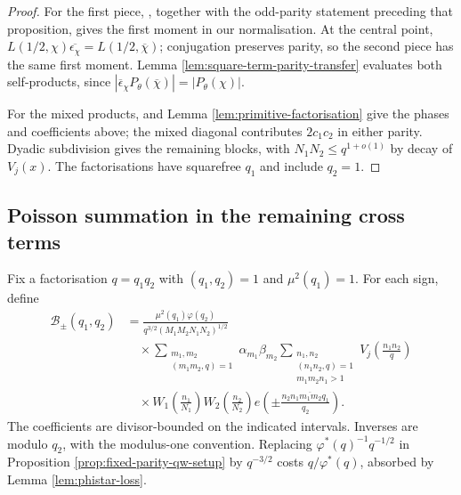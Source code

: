 \documentclass[12pt, a4paper]{amsart}
\numberwithin{equation}{section}
\newcommand{\e}{e}
\renewcommand{\bar}[1]{\overline{#1}}
\renewcommand{\le}{\leqslant}
\theoremstyle{plain}
\begin{document}
\begin{proof}
For the first piece, \cite[Proposition 2.1 and (2.4)]{QW}, together with the odd-parity statement preceding that proposition, gives the first moment in our normalisation. At the central point, $L(1/2,\chi)\overline{\epsilon_\chi}=L(1/2,\overline\chi)$; conjugation preserves parity, so the second piece has the same first moment. Lemma \ref{lem:square-term-parity-transfer} evaluates both self-products, since $|\bar\epsilon_\chi P_\theta(\bar\chi)|=|P_\theta(\chi)|$.

For the mixed products, \cite[(3.2)--(3.4)]{QW} and Lemma \ref{lem:primitive-factorisation} give the phases and coefficients above; the mixed diagonal contributes $2c_1c_2$ in either parity. Dyadic subdivision gives the remaining blocks, with $N_1N_2\le q^{1+o(1)}$ by decay of $V_j(x)$. The factorisations have squarefree $q_1$ and include $q_2=1$.
\end{proof}

\subsection{Poisson summation in the remaining cross terms}

Fix a factorisation ${q=q_1q_2}$ with $(q_1,q_2)=1$ and $\mu^2(q_1)=1$. For each sign, define
$$
\begin{aligned}
\mathcal B_\pm(q_1,q_2)
&=\frac{\mu^2(q_1)\varphi(q_2)}{q^{3/2}(M_1M_2N_1N_2)^{1/2}}\\
&\quad\times
\sum_{\substack{m_1,m_2\\ (m_1m_2,q)=1}}
\alpha_{m_1}\beta_{m_2}
\sum_{\substack{n_1,n_2\\ (n_1n_2,q)=1\\ m_1m_2n_1>1}}
V_j\left(\frac{n_1n_2}{q}\right)\\
&\quad\times
W_1\left(\frac{n_1}{N_1}\right)
W_2\left(\frac{n_2}{N_2}\right)
\e\left(\pm \frac{n_2\overline{n_1m_1m_2q_1}}{q_2}\right).
\end{aligned}
$$
The coefficients are divisor-bounded on the indicated intervals. Inverses are modulo $q_2$, with the modulus-one convention. Replacing $\varphi^*(q)^{-1}q^{-1/2}$ in Proposition \ref{prop:fixed-parity-qw-setup} by $q^{-3/2}$ costs $q/\varphi^*(q)$, absorbed by Lemma \ref{lem:phistar-loss}.
\end{document}
